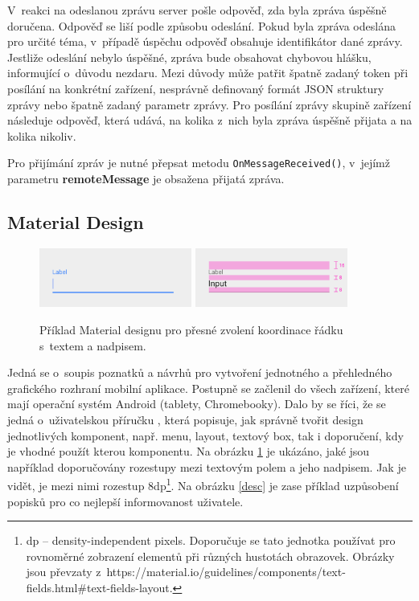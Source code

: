 V~reakci na odeslanou zprávu server pošle odpověď, zda byla zpráva úspěšně doručena. Odpověď se liší podle způsobu odeslání. Pokud byla zpráva odeslána pro určité téma, v~případě úspěchu odpověď obsahuje identifikátor dané zprávy. Jestliže odeslání nebylo úspěšné, zpráva bude obsahovat chybovou hlášku, informující o~důvodu nezdaru. Mezi důvody může patřit špatně zadaný token při posílání na konkrétní zařízení, nesprávně definovaný formát JSON struktury zprávy nebo špatně zadaný parametr zprávy. Pro posílání zprávy skupině zařízení následuje odpověď, která udává, na kolika z~nich byla zpráva úspěšně přijata a na kolika nikoliv.

Pro přijímání zpráv je nutné přepsat metodu \texttt{OnMessageReceived()}, v~jejímž parametru \textbf{remoteMessage}  je obsažena přijatá zpráva. 

\subsection*{Material Design}

\begin{figure}[H]
\centering
\includegraphics[width= 5cm]{obrazky-figures/label1}
\includegraphics[width= 5cm]{obrazky-figures/label}
\caption{Příklad Material designu pro přesné zvolení koordinace řádku s~textem a nadpisem.}
\label{label}
\end{figure}

Jedná se o~soupis poznatků a návrhů pro vytvoření jednotného a přehledného grafického rozhraní mobilní aplikace. Postupně se začlenil do všech zařízení, které mají operační systém Android (tablety, Chromebooky). Dalo by se říci, že se jedná o~uživatelskou příručku \cite{material}, která popisuje, jak správně tvořit design jednotlivých komponent, např. menu, layout, textový box, tak i doporučení, kdy je vhodné použít kterou komponentu. Na obrázku \ref{label} je ukázáno, jaké jsou například doporučovány rozestupy mezi textovým polem a jeho nadpisem. Jak je vidět, je mezi nimi rozestup 8dp\footnote{dp -- density-independent pixels. Doporučuje se tato jednotka používat pro rovnoměrné zobrazení elementů při různých hustotách obrazovek. Obrázky jsou převzaty z~https://material.io/guidelines/components/text-fields.html\#text-fields-layout.}. Na obrázku \ref{desc} je zase příklad uzpůsobení popisků pro co nejlepší informovanost uživatele. 


